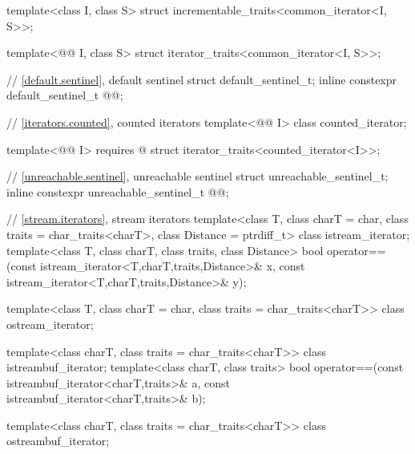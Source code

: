 \begin{codeblock}
{  template<class I, class S>
    struct incrementable_traits<common_iterator<I, S>>;

  template<@@ I, class S>
    struct iterator_traits<common_iterator<I, S>>;

  // \ref{default.sentinel}, default sentinel
  struct default_sentinel_t;
  inline constexpr default_sentinel_t @@{};

  // \ref{iterators.counted}, counted iterators
  template<@@ I> class counted_iterator;

  template<@@ I>
    requires @\seebelow@
    struct iterator_traits<counted_iterator<I>>;

  // \ref{unreachable.sentinel}, unreachable sentinel
  struct unreachable_sentinel_t;
  inline constexpr unreachable_sentinel_t @@{};

  // \ref{stream.iterators}, stream iterators
  template<class T, class charT = char, class traits = char_traits<charT>,
           class Distance = ptrdiff_t>
  class istream_iterator;
  template<class T, class charT, class traits, class Distance>
    bool operator==(const istream_iterator<T,charT,traits,Distance>& x,
                    const istream_iterator<T,charT,traits,Distance>& y);

  template<class T, class charT = char, class traits = char_traits<charT>>
      class ostream_iterator;

  template<class charT, class traits = char_traits<charT>>
    class istreambuf_iterator;
  template<class charT, class traits>
    bool operator==(const istreambuf_iterator<charT,traits>& a,
                    const istreambuf_iterator<charT,traits>& b);

  template<class charT, class traits = char_traits<charT>>
    class ostreambuf_iterator;

}
\end{codeblock}
